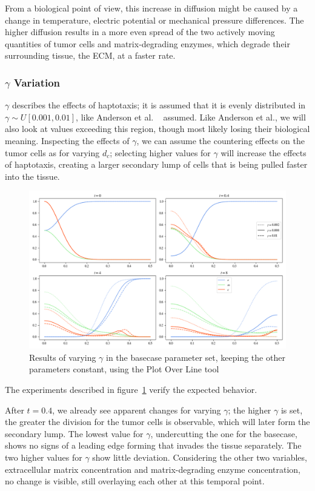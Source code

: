 From a biological point of view, this increase in diffusion might be caused by a change in temperature, electric potential or mechanical pressure differences. The higher diffusion results in a more even spread of the two actively moving quantities of tumor cells and matrix-degrading enzymes, which degrade their surrounding tissue, the ECM, at a faster rate.


\subsubsection*{$\gamma$ Variation}
$\gamma$ describes the effects of haptotaxis; it is assumed that it is evenly distributed in $\gamma \sim U[0.001,0.01]$, like Anderson et al. ~\cite{anderson_mathematical_2000} assumed. Like Anderson et al., we will also look at values exceeding this region, though most likely losing their biological meaning. Inspecting the effects of $\gamma$, we can assume the countering effects on the tumor cells as for varying $d_c$; selecting higher values for $\gamma$ will increase the effects of haptotaxis, creating a larger secondary lump of cells that is being pulled faster into the tissue.
\begin{figure}[h!]
 \centering
 \includegraphics[width=\textwidth]{resources/images/gamma_variation.png}
 \caption{Results of varying $\gamma$ in the basecase parameter set, keeping the other parameters constant, using the Plot Over Line tool}
 \label{fig:gamma_variation}
\end{figure}
The experiments described in figure~\ref{fig:gamma_variation} verify the expected behavior.

After $t=0.4$, we already see apparent changes for varying $\gamma$; the higher $\gamma$ is set, the greater the division for the tumor cells is observable, which will later form the secondary lump. The lowest value for $\gamma$, undercutting the one for the basecase, shows no signs of a leading edge forming that invades the tissue separately. The two higher values for $\gamma$ show little deviation. Considering the other two variables, extracellular matrix concentration and matrix-degrading enzyme concentration, no change is visible, still overlaying each other at this temporal point.


